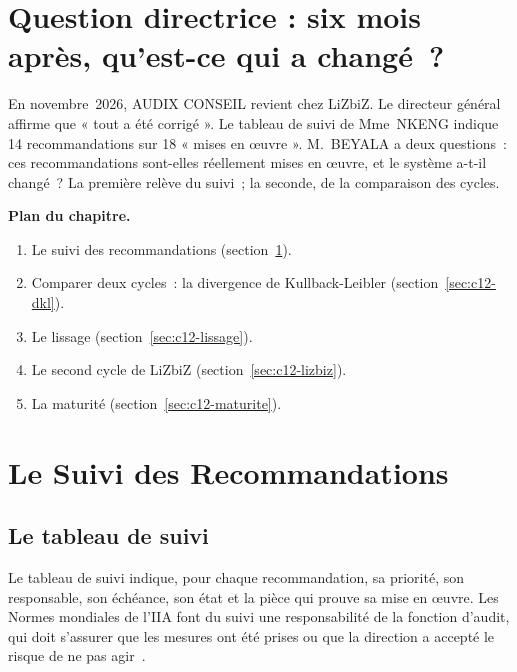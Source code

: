 \bigskip

\section*{Question directrice : six mois après, qu'est-ce qui a changé~?}

En novembre~2026, AUDIX CONSEIL revient chez LiZbiZ. Le directeur général
affirme que « tout a été corrigé ». Le tableau de suivi de Mme~NKENG
indique 14 recommandations sur 18 « mises en œuvre ». M.~BEYALA a deux
questions~: ces recommandations sont-elles réellement mises en œuvre, et le
système a-t-il changé~? La première relève du suivi~; la seconde, de la
comparaison des cycles.

\medskip
\textbf{Plan du chapitre.}
\begin{enumerate}
    \item Le suivi des recommandations (section~\ref{sec:c12-suivi}).
    \item Comparer deux cycles~: la divergence de Kullback-Leibler
          (section~\ref{sec:c12-dkl}).
    \item Le lissage (section~\ref{sec:c12-lissage}).
    \item Le second cycle de LiZbiZ (section~\ref{sec:c12-lizbiz}).
    \item La maturité (section~\ref{sec:c12-maturite}).
\end{enumerate}

\separateur

\section{Le Suivi des Recommandations}
\label{sec:c12-suivi}

\subsection{Le tableau de suivi}

Le tableau de suivi indique, pour chaque recommandation, sa priorité, son
responsable, son échéance, son état et la pièce qui prouve sa mise en
œuvre. Les Normes mondiales de l'IIA font du suivi une responsabilité de la
fonction d'audit, qui doit s'assurer que les mesures ont été prises ou que
la direction a accepté le risque de ne pas agir~\cite{iia2024gias}.

